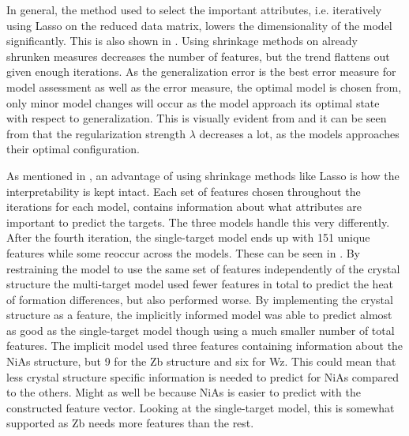 In general, the method used to select the important attributes, i.e. iteratively using Lasso on the reduced data matrix, lowers the dimensionality of the model significantly. This is also shown in . Using shrinkage methods on already shrunken measures decreases the number of features, but the trend flattens out given enough iterations. As the generalization error is the best error measure for model assessment as well as the error measure, the optimal model is chosen from, only minor model changes will occur as the model approach its optimal state with respect to generalization. This is visually evident from  and it can be seen from  that the regularization strength $\lambda$ decreases a lot, as the models approaches their optimal configuration.

As mentioned in , an advantage of using shrinkage methods like Lasso is how the interpretability is kept intact. Each set of features chosen throughout the iterations for each model, contains information about what attributes are important to predict the targets. The three models handle this very differently. After the fourth iteration, the single-target model ends up with 151 unique features while some reoccur across the models. These can be seen in . By restraining the model to use the same set of features independently of the crystal structure the multi-target model used fewer features in total to predict the heat of formation differences, but also performed worse. By implementing the crystal structure as a feature, the implicitly informed model was able to predict almost as good as the single-target model though using a much smaller number of total features. The implicit model used three features containing information about the NiAs structure, but 9 for the Zb structure and six for Wz. This could mean that less crystal structure specific information is needed to predict for NiAs compared to the others. Might as well be because NiAs is easier to predict with the constructed feature vector. Looking at the single-target model, this is somewhat supported as Zb needs more features than the rest. 


